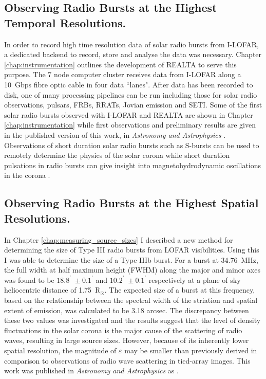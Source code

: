 \subsection{Observing Radio Bursts at the Highest Temporal Resolutions.}
In order to record high time resolution data of solar radio bursts from I-LOFAR, a dedicated backend to record, store and analyse the data was necessary. Chapter \ref{chap:instrumentation} outlines the development of REALTA to serve this purpose. The 7 node computer cluster receives data from I-LOFAR along a 10~Gbps fibre optic cable in four data ``lanes". After data has been recorded to disk, one of many processing pipelines can be run including those for solar radio observations, pulsars, FRBs, RRATs, Jovian emission and SETI. Some of the first solar radio bursts observed with I-LOFAR and REALTA are shown in Chapter \ref{chap:instrumentation} while first observations and preliminary results are given in the published version of this work, in \textit{Astronomy and Astrophysics} \citep{Murphy2021b}. Observations of short duration solar radio bursts such as S-bursts can be used to remotely determine the physics of the solar corona \citep{Morosan2015, Clarke2019} while short duration pulsations in radio bursts can give insight into magnetohydrodynamic oscillations in the corona \citep{Carley2019}.

\subsection{Observing Radio Bursts at the Highest Spatial Resolutions.}
In Chapter \ref{chap:measuring_source_sizes} I described a new method for determining the size of Type III radio bursts from LOFAR visibilities. Using this I was able to determine the size of a Type IIIb burst. For a burst at 34.76~MHz, the full width at half maximum height (FWHM) along the major and minor axes was found to be $18.8^\prime$~$\pm~0.1^\prime$ and $10.2^\prime$~$\pm~0.1^\prime$ respectively at a plane of sky heliocentric distance of 1.75~R$_\odot$. The expected size of a burst at this frequency, based on the relationship between the spectral width of the striation and spatial extent of emission, was calculated to be 3.18 arcsec. The discrepancy between these two values was investigated and the results suggest that the level of density fluctuations in the solar corona is the major cause of the scattering of radio waves, resulting in large source sizes. However, because of its inherently lower spatial resolution, the magnitude of $\varepsilon$ may be smaller than previously derived in comparison to observations of radio wave scattering in tied-array images. This work was published in \textit{Astronomy and Astrophysics} as \cite{Murphy2021}.

